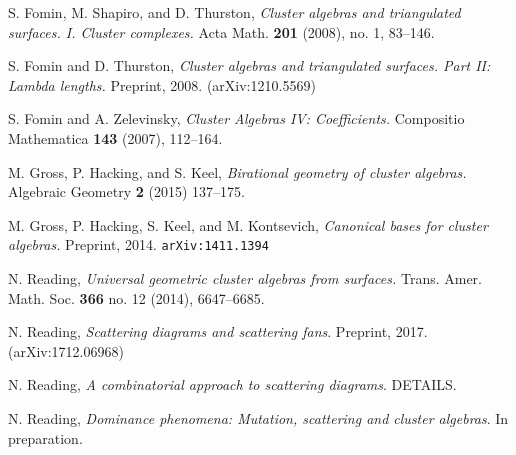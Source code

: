 \documentclass{amsart}
\theoremstyle{definition}
\theoremstyle{remark}
\numberwithin{equation}{section}
\newcommand{\0}{{\mathbf{0}}}
\begin{document}
\begin{thebibliography}{27}

S. Fomin, M. Shapiro, and D. Thurston,
\textit{Cluster algebras and triangulated surfaces. I. Cluster complexes.}
Acta Math. \textbf{201} (2008), no. 1, 83--146. 

S. Fomin and D. Thurston,
\textit{Cluster algebras and triangulated surfaces. Part II: Lambda lengths.}
Preprint, 2008.
(arXiv:1210.5569)

S. Fomin and A. Zelevinsky,
\textit{Cluster Algebras IV: Coefficients.}
Compositio Mathematica \textbf{143} (2007), 112--164.

M. Gross, P. Hacking, and S. Keel,
\textit{Birational geometry of cluster algebras.}
Algebraic Geometry \textbf{2} (2015) 137--175.

M. Gross, P. Hacking, S. Keel, and M. Kontsevich,
\textit{Canonical bases for cluster algebras.}
Preprint, 2014. \texttt{arXiv:1411.1394}

N. Reading,
\textit{Universal geometric cluster algebras from surfaces. }
Trans. Amer. Math. Soc. \textbf{366} no. 12 (2014), 6647--6685.

N. Reading, 
\textit{Scattering diagrams and scattering fans}. 
Preprint, 2017.  (arXiv:1712.06968)

N. Reading, 
\textit{A combinatorial approach to scattering diagrams}. 
DETAILS.

N. Reading, 
\textit{Dominance phenomena: Mutation, scattering and cluster algebras}. 
In preparation.

\end{thebibliography}
\end{document}
